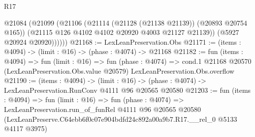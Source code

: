 \begin{lexlean}{R17}
\begin{coremodule}
          @21084
            (@21099
              (@21106
                (@21114 (@21128 (@21138 @21139)) (@20893 @20754 @165))
                (@21115 @126 @4102 @4102 @20920 @4003 @21127 @21139))
              (@5927 @20924 @20920))))))
@21168 := LexLeanPreservation.Obs
@21171 := (items : @4094) -> (limit : @16) -> (phase : @4074) -> @21168
@21182 := fun (items : @4094) =>
  fun (limit : @16) =>
  fun (phase : @4074) =>
  cond.{1} @21168 @20570 (LexLeanPreservation.Obs.value @20579) LexLeanPreservation.Obs.overflow
@21190 := (items : @4094) ->
  (limit : @16) -> (phase : @4074) -> LexLeanPreservation.RunConv @4111 @96 @20565 @20580
@21203 := fun (items : @4094) =>
  fun (limit : @16) =>
  fun (phase : @4074) =>
  LexLeanPreservation.run_of_funRel
    @4111
    @96
    @20565
    @20580
    (LexLeanPreserve.C64ebb6f0c07e904bdfd24c892a00a9b7.R17.__rel_0 @5133 @4117 @3975)
\end{coremodule}
\end{lexlean}
